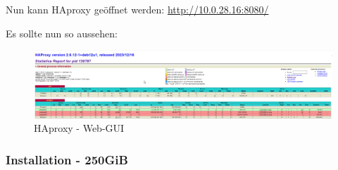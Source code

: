 Nun kann HAproxy geöffnet werden:
\url{http://10.0.28.16:8080/}

Es sollte nun so aussehen:
\begin{figure}[H]
    \centering
    \includegraphics[width=0.8\linewidth]{source/implementation/evaluation/postgresql_ha_solutions/patroni/haproxy_webgui}
    \caption{HAproxy - Web-GUI}
    \label{fig:haproxy-webgui}
\end{figure}

\subsubsection{Installation - 250GiB}

